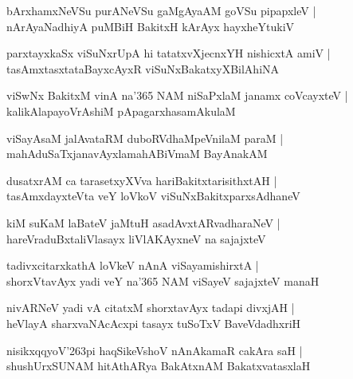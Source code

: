 \documentclass[twoside,12pt,openright]{book}
\def\S{\char'263}
\newcounter{shloka}[chapter]
\begin{document}
\begin{shloka}
bArxhamxNeVSu purANeVSu gaMgAyaAM goVSu pipapxleV |\\
nArAyaNadhiyA puMBiH BakitxH kArAyx hayxheYtukiV 
\end{shloka}

\begin{shloka}
parxtayxkaSx viSuNxrUpA hi tatatxvXjecnxYH nishicxtA amiV |\\
tasAmxtasxtataBayxcAyxR viSuNxBakatxyXBilAhiNA 
\end{shloka}

\begin{shloka}
viSwNx BakitxM vinA na\char'365 NAM niSaPxlaM janamx coVcayxteV |\\
kalikAlapayoVrAshiM pApagarxhasamAkulaM 
\end{shloka}

\begin{shloka}
viSayAsaM jalAvataRM duboRVdhaMpeVnilaM paraM |\\
mahAduSaTxjanavAyxlamahABiVmaM BayAnakAM 
\end{shloka}

\begin{shloka}
dusatxrAM ca tarasetxyXVva hariBakitxtarisithxtAH |\\
tasAmxdayxteVta veY loVkoV viSuNxBakitxparxsAdhaneV 
\end{shloka}

\begin{shloka}
kiM suKaM laBateV jaMtuH asadAvxtARvadharaNeV |\\
hareVraduBxtaliVlasayx liVlAKAyxneV na sajajxteV
\end{shloka}

\begin{shloka}
tadivxcitarxkathA loVkeV nAnA viSayamishirxtA |\\
shorxVtavAyx yadi veY na\char'365 NAM viSayeV sajajxteV manaH 
\end{shloka}

\begin{shloka}
nivARNeV yadi vA citatxM shorxtavAyx tadapi divxjAH |\\
heVlayA sharxvaNAcAcxpi tasayx tuSoTxV BaveVdadhxriH
\end{shloka}

\begin{shloka}
nisikxqqyoV\S pi haqSikeVshoV nAnAkamaR cakAra saH |\\
shushUrxSUNAM hitAthARya BakAtxnAM BakatxvatasxlaH 
\end{shloka}
\end{document}
